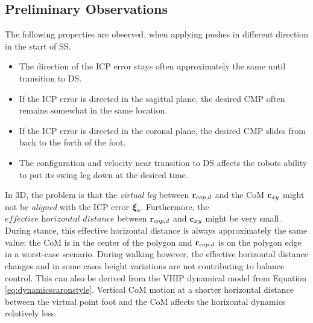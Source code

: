 \subsection{Preliminary Observations}
The following properties are observed, when applying pushes in different direction in the start of \ac{SS}.
\begin{itemize}
	\item The direction of the \ac{ICP} error stays often approximately the same until transition to \ac{DS}.
	\item If the \ac{ICP} error is directed in the sagittal plane, the desired \ac{CMP} often remains somewhat in the same location.
	\item If the \ac{ICP} error is directed  in the coronal plane, the desired \ac{CMP} slides from back to the forth of the foot.
	\item The configuration and velocity near transition to \ac{DS} affects the robots ability to put its swing leg down at the desired time. 
\end{itemize}

In \ac{3D}, the problem is that the \textit{virtual leg} between $\mathbf{r}_{cop,d}$ and the \ac{CoM} $\mathbf{c}_{xy}$ might not be \textit{aligned} with the \ac{ICP} error $\boldsymbol{\xi}_e$. Furthermore, the $\textit{effective horizontal distance}$ between $\mathbf{r}_{cop,d}$ and $\mathbf{c}_{xy}$ might be very small. During stance, this effective horizontal distance is always approximately the same value: the \ac{CoM} is in the center of the polygon and $\mathbf{r}_{cop,d}$ is on the polygon edge in a worst-case scenario. During walking however, the effective horizontal distance changes and in some cases height variations are not contributing to balance control. This can also be derived from the \ac{VHIP} dynamical model from Equation \ref{eq:dynamicscaronstyle}. Vertical \ac{CoM} motion at a shorter horizontal distance between the virtual point foot and the \ac{CoM} affects the horizontal dynamics relatively less.

